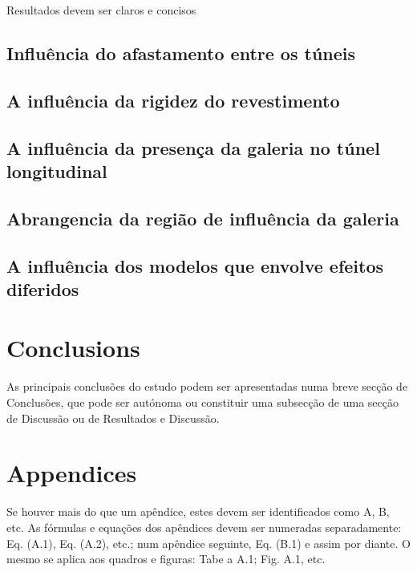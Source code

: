 \documentclass[a4paper,fleqn]{cas-sc}
\begin{document}
Resultados devem ser claros e concisos

\subsection{Influência do afastamento entre os túneis}\label{}

\subsection{A influência da rigidez do revestimento}\label{}

\subsection{A influência da presença da galeria no túnel longitudinal}\label{}

\subsection{Abrangencia da região de influência da galeria}\label{}

\subsection{A influência dos modelos que envolve efeitos diferidos}\label{}

\section{Conclusions}\label{}

As principais conclusões do estudo podem ser apresentadas numa breve secção de Conclusões, que pode ser autónoma ou constituir uma subsecção de uma secção de Discussão ou de Resultados e Discussão.

\section{Appendices}\label{}

Se houver mais do que um apêndice, estes devem ser identificados como A, B, etc. As fórmulas e equações dos apêndices devem ser numeradas separadamente: Eq. (A.1), Eq. (A.2), etc.; num apêndice seguinte,
Eq. (B.1) e assim por diante. O mesmo se aplica aos quadros e figuras: Tabe a A.1; Fig. A.1, etc.

\end{document}
